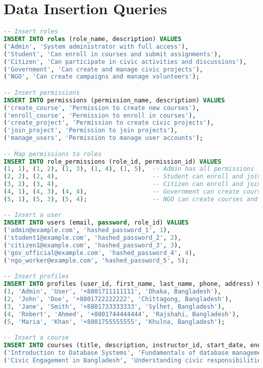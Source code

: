 \documentclass[12pt]{report}
\begin{document}
    \section{Data Insertion Queries}
    \begin{lstlisting}[language=SQL, caption=Inserting Sample Data]
-- Insert roles
INSERT INTO roles (role_name, description) VALUES
('Admin', 'System administrator with full access'),
('Student', 'Can enroll in courses and submit assignments'),
('Citizen', 'Can participate in civic activities and discussions'),
('Government', 'Can create and manage civic projects'),
('NGO', 'Can create campaigns and manage volunteers');

-- Insert permissions
INSERT INTO permissions (permission_name, description) VALUES
('create_course', 'Permission to create new courses'),
('enroll_course', 'Permission to enroll in courses'),
('create_project', 'Permission to create civic projects'),
('join_project', 'Permission to join projects'),
('manage_users', 'Permission to manage user accounts');

-- Map permissions to roles
INSERT INTO role_permissions (role_id, permission_id) VALUES
(1, 1), (1, 2), (1, 3), (1, 4), (1, 5),  -- Admin has all permissions
(2, 2), (2, 4),                          -- Student can enroll and join
(3, 2), (3, 4),                          -- Citizen can enroll and join
(4, 1), (4, 3), (4, 4),                  -- Government can create courses and projects
(5, 1), (5, 3), (5, 4);                  -- NGO can create courses and projects

-- Insert a user
INSERT INTO users (email, password, role_id) VALUES
('admin@example.com', 'hashed_password_1', 1),
('student1@example.com', 'hashed_password_2', 2),
('citizen1@example.com', 'hashed_password_3', 3),
('gov_official@example.com', 'hashed_password_4', 4),
('ngo_worker@example.com', 'hashed_password_5', 5);

-- Insert profiles
INSERT INTO profiles (user_id, first_name, last_name, phone, address) VALUES
(1, 'Admin', 'User', '+8801711111111', 'Dhaka, Bangladesh'),
(2, 'John', 'Doe', '+8801722222222', 'Chittagong, Bangladesh'),
(3, 'Jane', 'Smith', '+8801733333333', 'Sylhet, Bangladesh'),
(4, 'Robert', 'Ahmed', '+8801744444444', 'Rajshahi, Bangladesh'),
(5, 'Maria', 'Khan', '+8801755555555', 'Khulna, Bangladesh');

-- Insert a course
INSERT INTO courses (title, description, instructor_id, start_date, end_date) VALUES
('Introduction to Database Systems', 'Fundamentals of database management', 4, '2023-09-01', '2023-12-15'),
('Civic Engagement in Bangladesh', 'Understanding civic responsibilities', 5, '2023-10-01', '2024-01-15');


\end{lstlisting}
\end{document}
